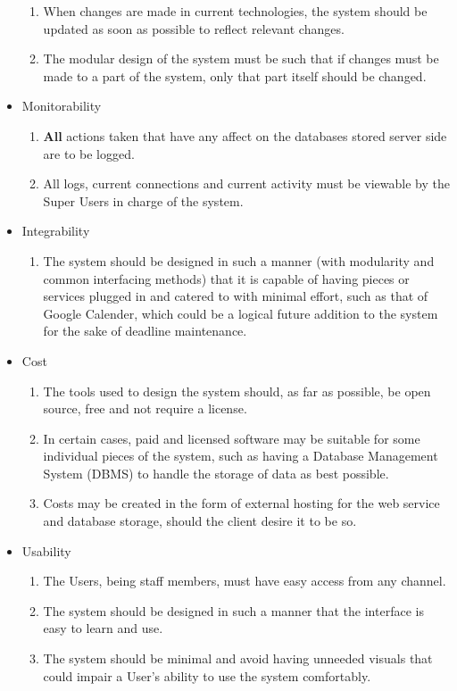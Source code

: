 \documentclass[10pt,a4paper]{exam}
\begin{document}
\begin{itemize}
\begin{enumerate}
			\item When changes are made in current technologies, the system should be updated as soon as possible to reflect relevant changes.
			\item The modular design of the system must be such that if changes must be made to a part of the system, only that part itself should be changed.
		\end{enumerate}
		\item Monitorability 
		\begin{enumerate}
			\item \textbf{All} actions taken that have any affect on the databases stored server side are to be logged.
			\item All logs, current connections and current activity must be viewable by the Super Users in charge of the system.
		\end{enumerate}
		\item Integrability
		\begin{enumerate}
			\item The system should be designed in such a manner (with modularity and common interfacing methods) that it is capable of having pieces or services plugged in and catered to with minimal effort, such as that of Google Calender, which could be a logical future addition to the system for the sake of deadline maintenance.
		\end{enumerate}
		\item Cost
		\begin{enumerate}
			\item The tools used to design the system should, as far as possible, be open source, free and not require a license.
			\item In certain cases, paid and licensed software may be suitable for some individual pieces of the system, such as having a Database Management System (DBMS) to handle the storage of data as best possible.
			\item Costs may be created in the form of external hosting for the web service and database storage, should the client desire it to be so.
		\end{enumerate}
		\item Usability
		\begin{enumerate}
			\item The Users, being staff members, must have easy access from any channel.
			\item The system should be designed in such a manner that the interface is easy to learn and use.
			\item The system should be minimal and avoid having unneeded visuals that could impair a User's ability to use the system comfortably.
		\end{enumerate}
	\end{itemize}
\end{document}
